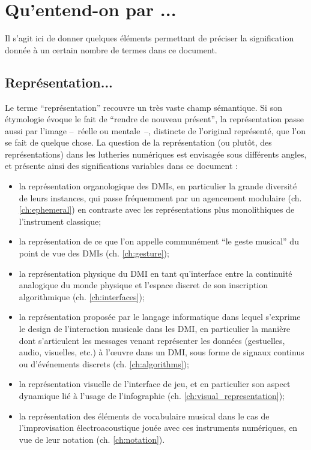\section{Qu'entend-on par ...}

\noindent Il s'agit ici de donner quelques éléments permettant de préciser la signification donnée à un certain nombre de termes dans ce document.

\subsection{Représentation...}

\noindent Le terme ``représentation'' recouvre un très vaste champ sémantique. Si son étymologie évoque le fait de ``rendre de nouveau présent'', la représentation passe aussi par l'image --~réelle ou mentale~--, distincte de l'original représenté, que l'on se fait de quelque chose. La question de la représentation (ou plutôt, des représentations) dans les lutheries numériques est envisagée sous différents angles, et présente ainsi des significations variables dans ce document : 
\vspace{-1em}
\begin{itemize}[noitemsep]
\item la représentation organologique des \glspl{DMI}, en particulier la grande diversité de leurs instances, qui passe fréquemment par un agencement modulaire (ch. \ref{ch:ephemeral}) en contraste avec les représentations plus monolithiques de l'instrument classique;
\item la représentation de ce que l'on appelle communément ``le geste musical'' du point de vue des \glspl{DMI} (ch. \ref{ch:gesture});
\item la représentation physique du \gls{DMI} en tant qu'interface entre la continuité analogique du monde physique et l'espace discret de son inscription algorithmique (ch. \ref{ch:interfaces});
\item la représentation proposée par le langage informatique dans lequel s'exprime le design de l'interaction musicale dans les \gls{DMI}, en particulier la manière dont s'articulent les messages venant représenter les données (gestuelles, audio, visuelles, etc.) à l'œuvre dans un \gls{DMI}, sous forme de signaux continus ou d'événements discrets (ch. \ref{ch:algorithms});
\item la représentation visuelle de l'interface de jeu, et en particulier son aspect dynamique lié à l'usage de l'infographie (ch. \ref{ch:visual_representation});
\item la représentation des éléments de vocabulaire musical dans le cas de l'improvisation électroacoustique jouée avec ces instruments numériques, en vue de leur notation (ch. \ref{ch:notation}).
\end{itemize}

